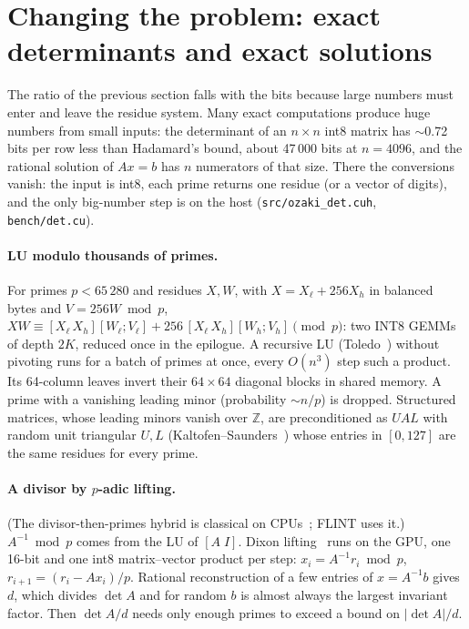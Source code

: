 \documentclass[11pt]{article}
\begin{document}
\section{Changing the problem: exact determinants and exact solutions}\label{sec:det}
The ratio of the previous section falls with the bits because large numbers must enter and leave the residue system. Many
exact computations produce huge numbers from small inputs: the determinant of an $n\times n$ int8 matrix has $\sim$0.72 bits per
row less than Hadamard's bound, about 47\,000 bits at $n=4096$, and the rational solution of $Ax=b$ has $n$ numerators of that
size. There the conversions vanish: the input is int8, each prime returns one residue (or a vector of digits), and the only
big-number step is on the host (\texttt{src/ozaki\_det.cuh}, \texttt{bench/det.cu}).

\paragraph{LU modulo thousands of primes.} For primes $p<65\,280$ and residues $X, W$, with $X=X_\ell+256X_h$ in balanced bytes and
$V=256W \bmod p$, $XW \equiv [X_\ell\,X_h][W_\ell;V_\ell] + 256\,[X_\ell\,X_h][W_h;V_h] \pmod p$: two INT8 GEMMs of depth $2K$,
reduced once in the epilogue. A recursive LU (Toledo~\cite{toledo97}) without pivoting runs for a batch of primes at once, every $O(n^3)$ step
such a product. Its 64-column leaves invert their $64\times64$ diagonal blocks in shared memory. A prime with a vanishing
leading minor (probability $\sim n/p$) is dropped. Structured matrices, whose leading minors vanish over $\mathbb Z$, are
preconditioned as $UAL$ with random unit triangular $U, L$ (Kaltofen--Saunders~\cite{ks91}) whose entries in $[0,127]$ are the same residues for every prime.

\paragraph{A divisor by $p$-adic lifting.} (The divisor-then-primes hybrid is classical on CPUs~\cite{pan88,abm99,urbanska07}; FLINT uses it.) $A^{-1}\bmod p$ comes from the LU of $[A\;I]$. Dixon lifting~\cite{dixon82} runs on the GPU, one
16-bit and one int8 matrix--vector product per step: $x_i=A^{-1}r_i \bmod p$, $r_{i+1}=(r_i-Ax_i)/p$. Rational reconstruction of a
few entries of $x=A^{-1}b$ gives $d$, which divides $\det A$ and for random $b$ is almost always the largest invariant factor.
Then $\det A/d$ needs only enough primes to exceed a bound on $|\det A|/d$.
\end{document}
